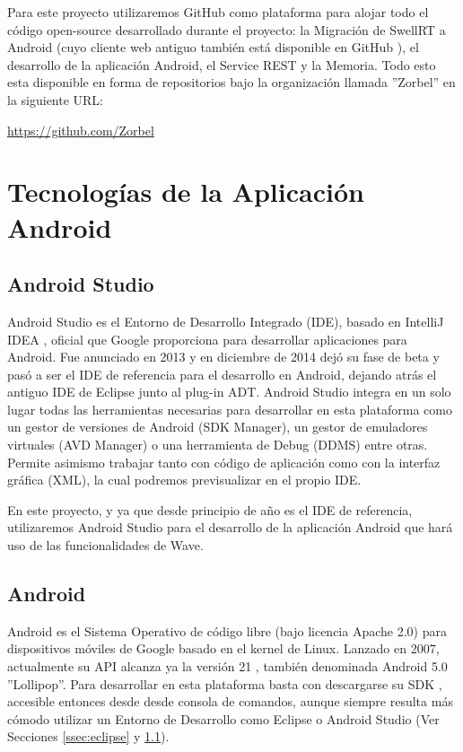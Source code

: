     Para este proyecto utilizaremos GitHub como plataforma para alojar todo el código open-source desarrollado durante el proyecto: la Migración de SwellRT a Android (cuyo cliente web antiguo también está disponible en GitHub \cite{ref:swellRT_github}), el desarrollo de la aplicación Android, el Service REST y la Memoria. Todo esto esta disponible en forma de repositorios bajo la organización llamada ''Zorbel'' en la siguiente URL:
    
    \url{https://github.com/Zorbel}    

\section{Tecnologías de la Aplicación Android}
    
    \subsection{Android Studio}\label{ssec:androidStudio}
    
	Android Studio \cite{ref:android_studio} es el Entorno de Desarrollo Integrado (IDE), basado en IntelliJ IDEA \cite{ref:intelliJ_Idea}, oficial que Google proporciona para desarrollar aplicaciones para Android. Fue anunciado en 2013 y en diciembre de 2014 dejó su fase de beta y pasó a ser el IDE de referencia para el desarrollo en Android, dejando atrás el antiguo IDE de Eclipse junto al plug-in ADT. Android Studio integra en un solo lugar todas las herramientas necesarias para desarrollar en esta plataforma como un gestor de versiones de Android (SDK Manager), un gestor de emuladores virtuales (AVD Manager) o una herramienta de Debug (DDMS) entre otras. Permite asimismo trabajar tanto con código de aplicación como con la interfaz gráfica (XML), la cual podremos previsualizar en el propio IDE.
	
	En este proyecto, y ya que desde principio de año es el IDE de referencia, utilizaremos Android Studio para el desarrollo de la aplicación Android que hará uso de las funcionalidades de Wave.
    
    \subsection{Android}\label{ssec:android}
    
	Android \cite{ref:android_platform} es el Sistema Operativo de código libre (bajo licencia Apache 2.0) para dispositivos móviles de Google basado en el kernel de Linux. Lanzado en 2007, actualmente su API alcanza ya la versión 21 \cite{ref:android_api21}, también denominada Android 5.0 ''Lollipop''. Para desarrollar en esta plataforma basta con descargarse su SDK \cite{ref:android_sdk}, accesible entonces desde desde consola de comandos, aunque siempre resulta más cómodo utilizar un Entorno de Desarrollo como Eclipse o Android Studio (Ver Secciones \ref{ssec:eclipse} y \ref{ssec:androidStudio}).
	
